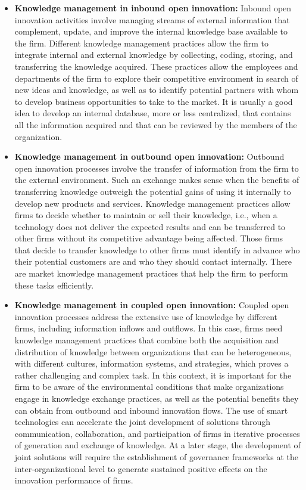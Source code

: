 \documentclass[
  letterpaper,
  DIV=11,
  numbers=noendperiod]{scrreprt}
\begin{document}
\begin{itemize}
\item
  \textbf{Knowledge management in inbound open innovation:} Inbound open
  innovation activities involve managing streams of external information
  that complement, update, and improve the internal knowledge base
  available to the firm. Different knowledge management practices allow
  the firm to integrate internal and external knowledge by collecting,
  coding, storing, and transferring the knowledge acquired. These
  practices allow the employees and departments of the firm to explore
  their competitive environment in search of new ideas and knowledge, as
  well as to identify potential partners with whom to develop business
  opportunities to take to the market. It is usually a good idea to
  develop an internal database, more or less centralized, that contains
  all the information acquired and that can be reviewed by the members
  of the organization.
\item
  \textbf{Knowledge management in outbound open innovation:} Outbound
  open innovation processes involve the transfer of information from the
  firm to the external environment. Such an exchange makes sense when
  the benefits of transferring knowledge outweigh the potential gains of
  using it internally to develop new products and services. Knowledge
  management practices allow firms to decide whether to maintain or sell
  their knowledge, i.e., when a technology does not deliver the expected
  results and can be transferred to other firms without its competitive
  advantage being affected. Those firms that decide to transfer
  knowledge to other firms must identify in advance who their potential
  customers are and who they should contact internally. There are market
  knowledge management practices that help the firm to perform these
  tasks efficiently.
\item
  \textbf{Knowledge management in coupled open innovation:} Coupled open
  innovation processes address the extensive use of knowledge by
  different firms, including information inflows and outflows. In this
  case, firms need knowledge management practices that combine both the
  acquisition and distribution of knowledge between organizations that
  can be heterogeneous, with different cultures, information systems,
  and strategies, which proves a rather challenging and complex task. In
  this context, it is important for the firm to be aware of the
  environmental conditions that make organizations engage in knowledge
  exchange practices, as well as the potential benefits they can obtain
  from outbound and inbound innovation flows. The use of smart
  technologies can accelerate the joint development of solutions through
  communication, collaboration, and participation of firms in iterative
  processes of generation and exchange of knowledge. At a later stage,
  the development of joint solutions will require the establishment of
  governance frameworks at the inter-organizational level to generate
  sustained positive effects on the innovation performance of firms.
\end{itemize}
\end{document}
